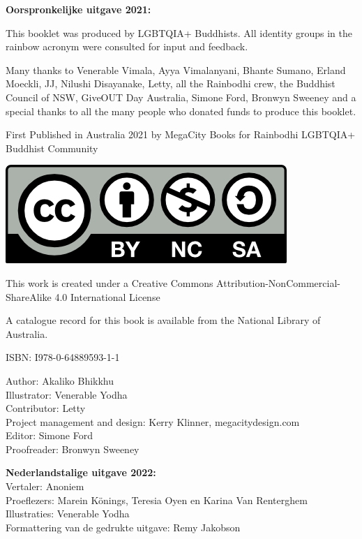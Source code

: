 \documentclass[12pt,openany]{book}
\begin{document}
{\footnotesize
\begin{center}
\noindent \textbf{Oorspronkelijke uitgave 2021:} 

This booklet was produced by LGBTQIA+ Buddhists. All identity groups in the rainbow acronym were consulted for input and feedback.

\noindent Many thanks to Venerable Vimala, Ayya Vimalanyani, Bhante Sumano, Erland Moeckli, JJ, Nilushi Disayanake, Letty, all the Rainbodhi crew, the Buddhist Council of NSW, GiveOUT Day Australia, Simone Ford, Bronwyn Sweeney and a special thanks to all the many people who donated funds to produce this booklet.

\medskip

\noindent First Published in Australia 2021 by MegaCity Books for Rainbodhi LGBTQIA+ Buddhist Community

\smallskip

\includegraphics{by-nc-sa}

\noindent This work is created under a Creative Commons Attribution-NonCommercial-ShareAlike 4.0 International License

\noindent A catalogue record for this book is available from the National Library of Australia.

\medskip

\noindent ISBN: I978-0-64889593-1-1

\medskip

Author: Akaliko Bhikkhu \\
Illustrator: Venerable Yodha \\
Contributor: Letty \\
Project management and design: Kerry Klinner, megacitydesign.com \\
Editor: Simone Ford \\
Proofreader: Bronwyn Sweeney

\bigskip

\textbf{Nederlandstalige uitgave 2022:}  \\
Vertaler: Anoniem \\
Proeflezers: Marein Könings, Teresia Oyen en Karina Van Renterghem \\
Illustraties: Venerable Yodha \\
Formattering van de gedrukte uitgave: Remy Jakobson
\end{center}
}
\end{document}
